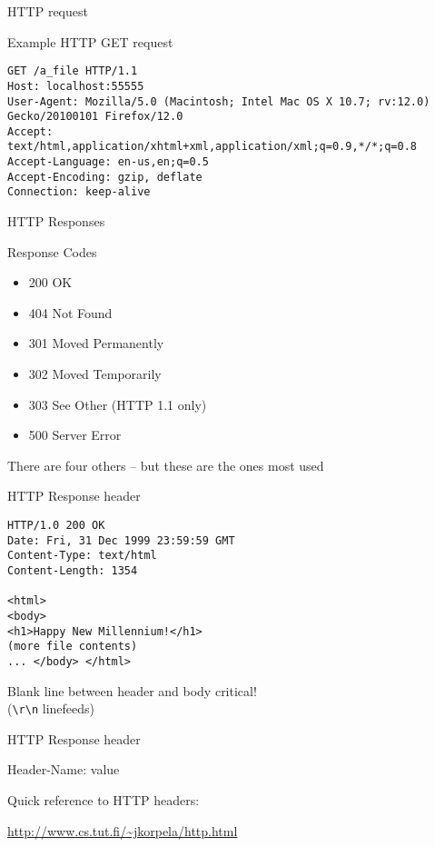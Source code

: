 \documentclass{beamer}
\begin{document}
\begin{frame}[fragile]{HTTP request}

{\Large Example HTTP GET request}
\begin{verbatim}
GET /a_file HTTP/1.1
Host: localhost:55555
User-Agent: Mozilla/5.0 (Macintosh; Intel Mac OS X 10.7; rv:12.0) Gecko/20100101 Firefox/12.0
Accept: text/html,application/xhtml+xml,application/xml;q=0.9,*/*;q=0.8
Accept-Language: en-us,en;q=0.5
Accept-Encoding: gzip, deflate
Connection: keep-alive
\end{verbatim}

\end{frame}

\begin{frame}{HTTP Responses}

{\Large Response Codes}

\begin{itemize}
\item 200 OK
\item 404 Not Found
\item 301 Moved Permanently
\item 302 Moved Temporarily
\item 303 See Other (HTTP 1.1 only)
\item 500 Server Error
\end{itemize}

\vfill
There are four others -- but these are the ones most used
\end{frame}

\begin{frame}[fragile]{HTTP Response header}

\begin{verbatim}
HTTP/1.0 200 OK
Date: Fri, 31 Dec 1999 23:59:59 GMT
Content-Type: text/html
Content-Length: 1354

<html>
<body>
<h1>Happy New Millennium!</h1>
(more file contents)
... </body> </html>
\end{verbatim}

\vfill
Blank line between header and body critical!\\
 \hspace{0.25in} (\verb|\r\n| linefeeds)
\end{frame}

\begin{frame}[fragile]{HTTP Response header}

{\Large Header-Name: value}

\vfill
{\Large Quick reference to HTTP headers:}

\vfill
\url{http://www.cs.tut.fi/~jkorpela/http.html}
\end{frame}
\end{document}

